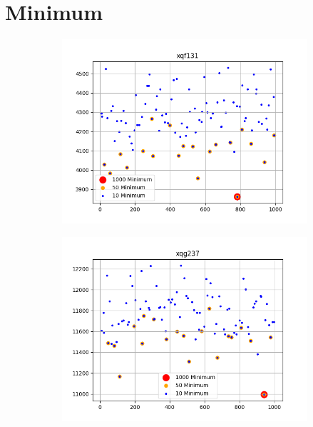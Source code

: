 \documentclass{article}
\def\v{0.4}
\begin{document}
\section{Minimum}
\begin{figure}[h!]
	\centering
	\begin{subfigure}[b]{\v\linewidth}
		\includegraphics[width=\linewidth]{graphs/min_xqf131.png}
	\end{subfigure}
	\begin{subfigure}[b]{\v\linewidth}
		\includegraphics[width=\linewidth]{graphs/min_xqg237.png}
	\end{subfigure}
	\begin{subfigure}[b]{\v\linewidth}

\end{subfigure}
\end{figure}
\end{document}
